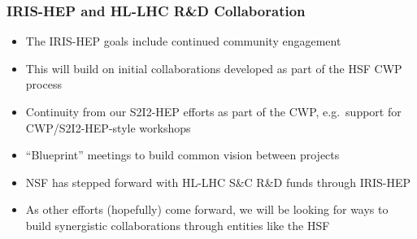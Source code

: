 \begin{frame}
\frametitle{IRIS-HEP and HL-LHC R\&D Collaboration}

\begin{itemize}
\item The IRIS-HEP goals include continued community engagement 
\item This will build on initial collaborations developed as part of the HSF CWP process
\item Continuity from our S2I2-HEP efforts as part of the CWP, e.g.\ support for CWP/S2I2-HEP-style workshops
\item ``Blueprint'' meetings to build common vision between projects
\item NSF has stepped forward with HL-LHC S\&C R\&D funds through IRIS-HEP
\item As other efforts (hopefully) come forward, we will be looking for ways to build synergistic collaborations through entities like the HSF
\end{itemize}

\end{frame}


